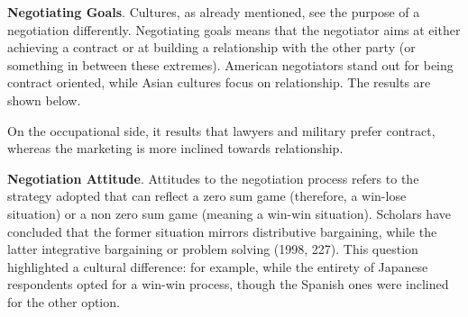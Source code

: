 \documentclass[../main.tex]{subfiles}
\begin{document}
\textbf{Negotiating Goals}. Cultures, as already mentioned, see the purpose of a negotiation differently. Negotiating goals means that the negotiator aims at either achieving a contract or at building a relationship with the other party (or something in between these extremes). American negotiators stand out for being contract oriented, while Asian cultures focus on relationship. The results are shown below.

\vspace{0.3cm}
\begin{minipage}{\linewidth}
    \label{negotiationGoalPerCountry}
\end{minipage}
\vspace{0.3cm}

On the occupational side, it results that lawyers and military prefer contract, whereas the marketing is more inclined towards relationship.

\vspace{0.3cm}
\begin{minipage}{\linewidth}
    \label{negotiationGoalPerProfession}
\end{minipage}
\vspace{0.3cm}

\textbf{Negotiation Attitude}. Attitudes to the negotiation process refers to the strategy adopted that can reflect a zero sum game (therefore, a win-lose situation) or a non zero sum game (meaning a win-win situation). Scholars have concluded that the former situation mirrors distributive bargaining, while the latter integrative bargaining or problem solving (1998, 227). This question highlighted a cultural difference: for example, while the entirety of Japanese respondents opted for a win-win process, though the Spanish ones were inclined for the other option.
\end{document}
